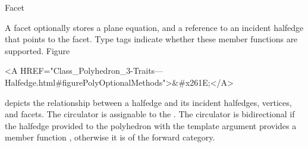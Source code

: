 
\ccRefPageBegin



\begin{ccRefClass}{Facet}

\ccDefinition
  
A facet optionally stores a plane equation, and a reference to an 
incident halfedge that points to the facet. Type tags indicate whether 
these member functions are supported.  
Figure~\begin{ccHtmlOnly}
  <A HREF="Class_Polyhedron_3-Traits---Halfedge.html#figurePolyOptionalMethods">&#x261E;</A>
\end{ccHtmlOnly}
depicts the relationship between a halfedge and its incident
halfedges, vertices, and facets. The circulator is assignable to the
. The circulator is bidirectional if the
halfedge provided to the polyhedron with the  template
argument provides a member function , otherwise it is
of the forward category.



\ccTypes
{}
\ccThreeToTwo

\ccGlue
{}
\ccGlue
{}

\ccGlue
{}
\ccGlue
{}
\ccGlue
{}

\ccGlue
{}
\ccGlue
{}
\ccGlue
{}


\end{ccRefClass}

